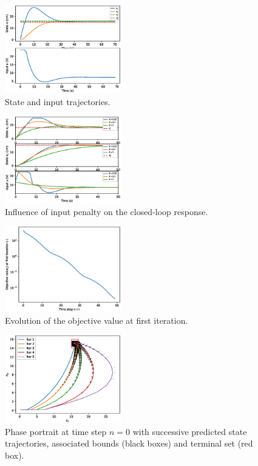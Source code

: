 \documentclass[letterpaper, 10 pt, conference]{ieeeconf}
\begin{document}
\begin{figure}[h]
    \centering
    \includegraphics[width=0.45\textwidth]{img/tmpc1.eps} %
    \caption{State and input trajectories.}
    \label{fig:tmpc1}
\end{figure}

\begin{figure}[h]
    \centering
    \includegraphics[width=0.45\textwidth]{img/tmpc2.eps} %
    \caption{Influence of input penalty on the closed-loop response.}
    \label{fig:tmpc2}
\end{figure}

\begin{figure}[h]
    \centering
    \includegraphics[width=0.45\textwidth]{img/tmpc3.eps} %
    \caption{Evolution of the objective value at first iteration.}
    \label{fig:tmpc3}
\end{figure}

\begin{figure}[h]
    \centering
    \includegraphics[width=0.45\textwidth]{img/tmpc4.eps} %
    \caption{Phase portrait at time step $n=0$ with successive predicted state trajectories, associated bounds (black boxes) and terminal set (red box).}
    \label{fig:tmpc4}
\end{figure}
\end{document}
